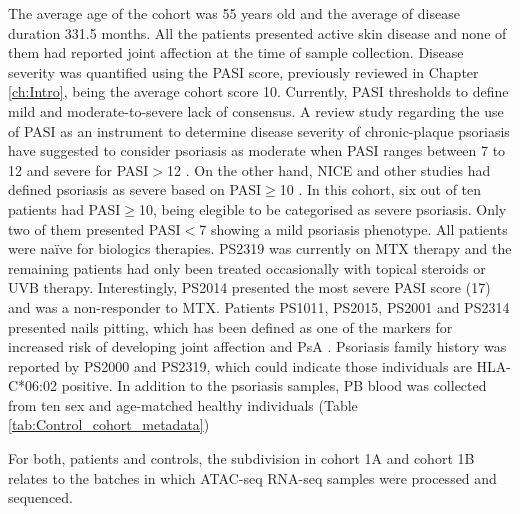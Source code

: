 The average age of the cohort was 55 years old and the average of disease duration 331.5 months. All the patients presented active skin disease and none of them had reported joint affection at the time of sample collection. Disease severity was quantified using the PASI score, previously reviewed in Chapter \ref{ch:Intro}, being the average cohort score 10. Currently,  PASI thresholds to define mild and moderate-to-severe lack of consensus. A review study regarding the use of PASI as an instrument to determine disease severity of chronic-plaque psoriasis have suggested to consider psoriasis as moderate when PASI ranges between 7 to 12 and severe for PASI$>$12 \parencite{Schmitt2005}. On the other hand, NICE and other studies had defined psoriasis as severe based on PASI$\geq$10 \parencite{Woolacott2006, Finlay2005}. In this cohort, six out of ten patients had PASI$\geq$10, being elegible to be categorised as severe psoriasis. Only two of them presented PASI$<$7 showing a mild psoriasis phenotype. All patients were na\"{i}ve for biologics therapies. PS2319 was currently on MTX therapy and the remaining patients had only been treated occasionally with topical steroids or UVB therapy. Interestingly, PS2014 presented the most severe PASI score (17) and was a non-responder to MTX. Patients PS1011, PS2015, PS2001 and PS2314 presented nails pitting, which has been defined as one of the markers for increased risk of developing joint affection and PsA \parencite{Moll1976,Griffiths2007,McGonagle,2011}. Psoriasis family history was reported by PS2000 and PS2319, which could indicate those individuals are HLA-C*06:02 positive. In addition to the psoriasis samples, PB blood was collected from ten sex and age-matched healthy individuals (Table \ref{tab:Control_cohort_metadata})

For both, patients and controls, the subdivision in cohort 1A and cohort 1B relates to the batches in which ATAC-seq RNA-seq samples were processed and sequenced.


